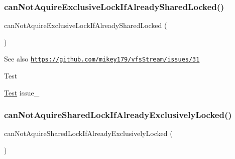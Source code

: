 \subsubsection{\texorpdfstring{can\+Not\+Aquire\+Exclusive\+Lock\+If\+Already\+Shared\+Locked()}{canNotAquireExclusiveLockIfAlreadySharedLocked()}}
{\footnotesize\ttfamily can\+Not\+Aquire\+Exclusive\+Lock\+If\+Already\+Shared\+Locked (\begin{DoxyParamCaption}{ }\end{DoxyParamCaption})}

\begin{DoxySeeAlso}{See also}
\href{https://github.com/mikey179/vfsStream/issues/31}{\tt https\+://github.\+com/mikey179/vfs\+Stream/issues/31} 
\end{DoxySeeAlso}
\begin{DoxyRefDesc}{Test}
\item[\mbox{\hyperlink{test__test000227}{Test}}]issue\+\_ \end{DoxyRefDesc}
\mbox{\label{classorg_1_1bovigo_1_1vfs_1_1vfs_stream_wrapper_flock_test_case_a569c92bf78e7f6f2976c725c385bb890}} 
\subsubsection{\texorpdfstring{can\+Not\+Aquire\+Shared\+Lock\+If\+Already\+Exclusively\+Locked()}{canNotAquireSharedLockIfAlreadyExclusivelyLocked()}}
{\footnotesize\ttfamily can\+Not\+Aquire\+Shared\+Lock\+If\+Already\+Exclusively\+Locked (\begin{DoxyParamCaption}{ }\end{DoxyParamCaption})}

